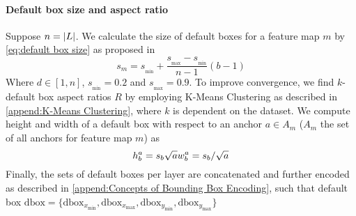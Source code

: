 \paragraph{Default box size and aspect ratio}\label{verysubsect:Default box size and aspect ratio}
Suppose \(n=\abs{L}\). We calculate the size of default boxes for a feature map
\(m\) by \autoref{eq:default box size} as proposed in \cite{Liu.2016}
\begin{equation}
    s_m=s_{_\text{min}} + \frac{s_{_\text{max}}-s_{_\text{min}}}{n-1}(b-1)
\end{equation}\label{eq:default box size}
Where \(d\in [1, n]\), \(s_{_\text{min}}=0.2\) and \(s_{_\text{max}}=0.9\). To improve 
convergence, we find \(k\)-default box aspect ratios \(R\) by employing K-Means 
Clustering as described in \autoref{append:K-Means Clustering}, where \(k\) is 
dependent on the dataset. We compute 
height and width of a default box with respect to an anchor \(a\in A_m\) (\(A_m\)
the set of all anchors for feature map \(m\)) as
\begin{equation}
    h_b^a=s_b\sqrt{a}\\
    w_b^a=s_b/\sqrt{a}
\end{equation}
Finally, the sets of default boxes per \gls{layer} are concatenated and further
encoded as described in \autoref{append:Concepts of Bounding Box Encoding}, such
that default box
\(\text{dbox} = \{\text{dbox}_{x_\text{min}}, \text{dbox}_{x_\text{max}}, \text{dbox}_{y_\text{min}}, \text{dbox}_{y_\text{max}}\}\)

